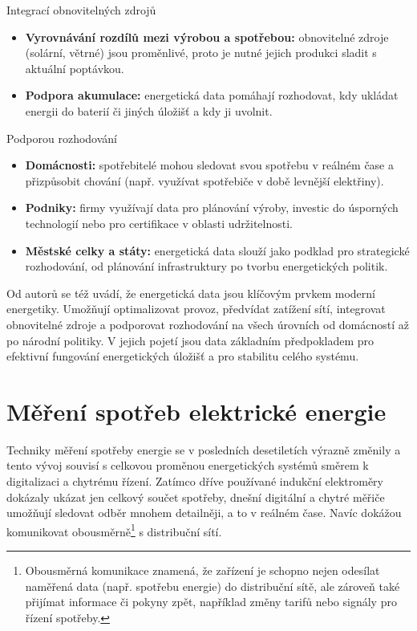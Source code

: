 Integrací obnovitelných zdrojů
\begin{itemize}
    \item \textbf{Vyrovnávání rozdílů mezi výrobou a spotřebou:} obnovitelné zdroje (solární, větrné)
    jsou proměnlivé, proto je nutné jejich produkci sladit s aktuální poptávkou.
    \item \textbf{Podpora akumulace:} energetická data pomáhají rozhodovat, kdy ukládat energii do baterií
    či jiných úložišť a kdy ji uvolnit.
\end{itemize}

Podporou rozhodování
\begin{itemize}
    \item \textbf{Domácnosti:} spotřebitelé mohou sledovat svou spotřebu v reálném čase a přizpůsobit
    chování (např. využívat spotřebiče v době levnější elektřiny).
    \item \textbf{Podniky:} firmy využívají data pro plánování výroby, investic do úsporných technologií
    nebo pro certifikace v oblasti udržitelnosti.
    \item \textbf{Městské celky a státy:} energetická data slouží jako podklad pro strategické
    rozhodování, od plánování infrastruktury po tvorbu energetických politik.

\end{itemize}

 Od autorů \cite{Sterner2019} se též uvádí, že energetická data jsou klíčovým prvkem moderní energetiky. Umožňují optimalizovat provoz, předvídat zatížení sítí, 
 integrovat obnovitelné zdroje a podporovat rozhodování na všech úrovních od domácností až po národní 
politiky. V jejich pojetí jsou data základním předpokladem pro efektivní fungování energetických úložišť a pro stabilitu celého systému.


\section{Měření spotřeb elektrické energie}

Techniky měření spotřeby energie se v posledních desetiletích výrazně změnily a tento vývoj souvisí s celkovou proměnou energetických systémů směrem k digitalizaci a chytrému řízení. 
Zatímco dříve používané indukční elektroměry dokázaly ukázat jen celkový součet spotřeby, dnešní digitální a chytré měřiče umožňují sledovat odběr mnohem detailněji, a to v  reálném čase. Navíc dokážou komunikovat obousměrně\footnote{Obousměrná komunikace znamená, že zařízení je schopno nejen odesílat naměřená data (např. spotřebu energie) do distribuční sítě, ale zároveň také přijímat informace či pokyny zpět, například změny tarifů nebo signály pro řízení spotřeby.} s distribuční sítí.

